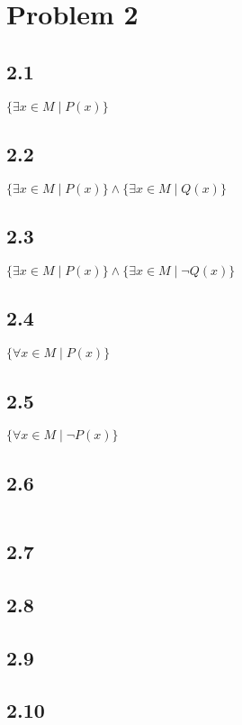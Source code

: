 \documentclass{article}
\begin{document}
\section*{Problem 2}
\begin{multicols}{2}
\subsection*{2.1}
$\{\exists x \in M \mid P(x)\}$
\subsection*{2.2}
$\{\exists x \in M \mid P(x)\} \land \{\exists x \in M \mid Q(x)\} $
\subsection*{2.3}
$\{\exists x \in M \mid P(x)\} \land \{\exists x \in M \mid \neg Q(x)\}$
\subsection*{2.4}
$\{\forall x \in M \mid P(x)\}$
\subsection*{2.5}
$\{\forall x \in M \mid \neg P(x)\}$

\subsection*{2.6}
$$ $$
\subsection*{2.7}
\subsection*{2.8}
\subsection*{2.9}
\subsection*{2.10}
\end{multicols}
\pagebreak
\end{document}
